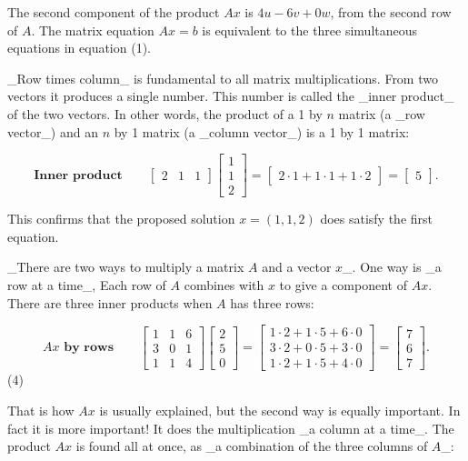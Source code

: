 The second component of the product \(Ax\) is \(4u-6v+0w\), from the second row of \(A\). The matrix equation \(Ax=b\) is equivalent to the three simultaneous equations in equation (1).

_Row times column_ is fundamental to all matrix multiplications. From two vectors it produces a single number. This number is called the _inner product_ of the two vectors. In other words, the product of a 1 by \(n\) matrix (a _row vector_) and an \(n\) by 1 matrix (a _column vector_) is a 1 by 1 matrix:

\[\textbf{Inner product}\qquad\begin{bmatrix}2&1&1\end{bmatrix}\begin{bmatrix}1 \\ 1\\ 2\end{bmatrix}=\begin{bmatrix}2\cdot 1+1\cdot 1+1\cdot 2\end{bmatrix}=\begin{bmatrix}5 \end{bmatrix}.\]

This confirms that the proposed solution \(x=(1,1,2)\) does satisfy the first equation.

_There are two ways to multiply a matrix \(A\) and a vector \(x\)_. One way is _a row at a time_, Each row of \(A\) combines with \(x\) to give a component of \(Ax\). There are three inner products when \(A\) has three rows:

\[Ax\textbf{ by rows}\qquad\begin{bmatrix}1&1&6\\ 3&0&1\\ 1&1&4\end{bmatrix}\begin{bmatrix}2\\ 5\\ 0\end{bmatrix}=\begin{bmatrix}1\cdot 2+1\cdot 5+6\cdot 0\\ 3\cdot 2+0\cdot 5+3\cdot 0\\ 1\cdot 2+1\cdot 5+4\cdot 0\end{bmatrix}=\begin{bmatrix}7\\ 6\\ 7\end{bmatrix}.\] (4)

That is how \(Ax\) is usually explained, but the second way is equally important. In fact it is more important! It does the multiplication _a column at a time_. The product \(Ax\) is found all at once, as _a combination of the three columns of \(A\)_:

